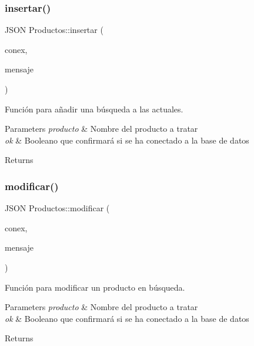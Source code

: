 \subsubsection{\texorpdfstring{insertar()}{insertar()}}
{\footnotesize\ttfamily J\+S\+ON Productos\+::insertar (\begin{DoxyParamCaption}\item[{bool}]{conex,  }\item[{J\+S\+ON}]{mensaje }\end{DoxyParamCaption})}



Función para añadir una búsqueda a las actuales. 


\begin{DoxyParams}{Parameters}
{\em producto} & Nombre del producto a tratar \\
\hline
{\em ok} & Booleano que confirmará si se ha conectado a la base de datos \\
\hline
\end{DoxyParams}
\begin{DoxyReturn}{Returns}

\end{DoxyReturn}
\mbox{\label{classProductos_a2c74f34bcdc389ffe8b5413f21e21db5}} 
\subsubsection{\texorpdfstring{modificar()}{modificar()}}
{\footnotesize\ttfamily J\+S\+ON Productos\+::modificar (\begin{DoxyParamCaption}\item[{bool}]{conex,  }\item[{J\+S\+ON}]{mensaje }\end{DoxyParamCaption})}



Función para modificar un producto en búsqueda. 


\begin{DoxyParams}{Parameters}
{\em producto} & Nombre del producto a tratar \\
\hline
{\em ok} & Booleano que confirmará si se ha conectado a la base de datos \\
\hline
\end{DoxyParams}
\begin{DoxyReturn}{Returns}

\end{DoxyReturn}
\mbox{\label{classProductos_aab417da8db29ade463c7c5102e273d16}} 
